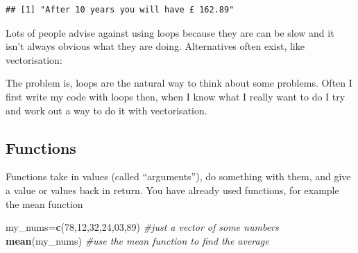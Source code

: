 \documentclass[]{book}
\newenvironment{Shaded}{\begin{snugshade}}{\end{snugshade}}
\newcommand{\KeywordTok}[1]{\textcolor[rgb]{0.13,0.29,0.53}{\textbf{#1}}}
\newcommand{\DecValTok}[1]{\textcolor[rgb]{0.00,0.00,0.81}{#1}}
\newcommand{\FloatTok}[1]{\textcolor[rgb]{0.00,0.00,0.81}{#1}}
\newcommand{\StringTok}[1]{\textcolor[rgb]{0.31,0.60,0.02}{#1}}
\newcommand{\CommentTok}[1]{\textcolor[rgb]{0.56,0.35,0.01}{\textit{#1}}}
\newcommand{\OperatorTok}[1]{\textcolor[rgb]{0.81,0.36,0.00}{\textbf{#1}}}
\newcommand{\NormalTok}[1]{#1}
\begin{document}
\begin{verbatim}
## [1] "After 10 years you will have £ 162.89"
\end{verbatim}

Lots of people advise against using loops because they are can be slow
and it isn't always obvious what they are doing. Alternatives often
exist, like vectorisation:

\begin{Shaded}
\end{Shaded}

The problem is, loops are the natural way to think about some problems.
Often I first write my code with loops then, when I know what I really
want to do I try and work out a way to do it with vectorisation.

\hypertarget{functions}{\subsection{Functions}\label{functions}}

Functions take in values (called ``arguments''), do something with them,
and give a value or values back in return. You have already used
functions, for example the mean function

\begin{Shaded}
\begin{Highlighting}[]
\NormalTok{my_nums=}\KeywordTok{c}\NormalTok{(}\DecValTok{78}\NormalTok{,}\DecValTok{12}\NormalTok{,}\DecValTok{32}\NormalTok{,}\DecValTok{24}\NormalTok{,}\DecValTok{03}\NormalTok{,}\DecValTok{89}\NormalTok{) }\CommentTok{#just a vector of some numbers}
\KeywordTok{mean}\NormalTok{(my_nums) }\CommentTok{#use the mean function to find the average}
\end{Highlighting}
\end{Shaded}
\end{document}

